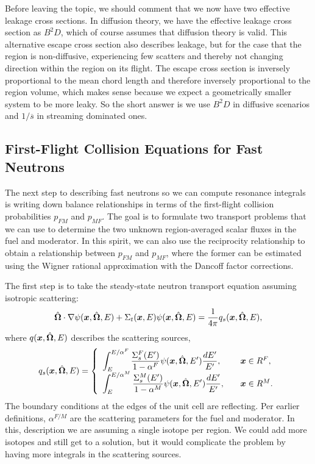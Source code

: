 Before leaving the topic, we should comment that we now have two effective leakage cross sections. In diffusion theory, we have the effective leakage cross section as $B^2 D$, which of course assumes that diffusion theory is valid. This alternative escape cross section also describes leakage, but for the case that the region is non-diffusive, experiencing few scatters and thereby not changing direction within the region on its flight. The escape cross section is inversely proportional to the mean chord length and therefore inversely proportional to the region volume, which makes sense because we expect a geometrically smaller system to be more leaky. So the short answer is we use $B^2 D$ in diffusive scenarios and $1/\overline{s}$ in streaming dominated ones.

\subsection{First-Flight Collision Equations for Fast Neutrons}

The next step to describing fast neutrons so we can compute resonance integrals is writing down balance relationships in terms of the first-flight collision probabilities $p_{FM}$ and $p_{MF}$. The goal is to formulate two transport problems that we can use to determine the two unknown region-averaged scalar fluxes in the fuel and moderator. In this spirit, we can also use the reciprocity relationship to obtain a relationship between $p_{FM}$ and $p_{MF}$, where the former can be estimated using the Wigner rational approximation with the Dancoff factor corrections.

The first step is to take the steady-state neutron transport equation assuming isotropic scattering:
\begin{align}
  \hat{\mathbf{\Omega}} \cdot \nabla \psi(\bm{x},\hat{\mathbf{\Omega}},E) + \Sigma_t(\bm{x},E) \psi(\bm{x},\hat{\mathbf{\Omega}},E) = \frac{1}{4\pi} q_s(\bm{x},\hat{\mathbf{\Omega}},E),
\end{align}
where $q(\bm{x},\hat{\mathbf{\Omega}},E)$ describes the scattering sources,
\begin{align}
  q_s(\bm{x},\hat{\mathbf{\Omega}},E) = \left\{ \begin{array}{l l}
  \displaystyle\int_E^{E/\alpha^F} \dfrac{ \Sigma_s^F(E') }{ 1 - \alpha^F } \psi(\bm{x},\hat{\mathbf{\Omega}},E') \dfrac{ dE' }{ E' } , & \quad \bm{x} \in R^F, \\
  \displaystyle\int_E^{E/\alpha^M} \dfrac{ \Sigma_s^M(E') }{ 1 - \alpha^M } \psi(\bm{x},\hat{\mathbf{\Omega}},E') \dfrac{ dE' }{ E' } , & \quad \bm{x} \in R^M. \\ \end{array} \right. 
\end{align}
The boundary conditions at the edges of the unit cell are reflecting. Per earlier definitions, $\alpha^{F/M}$ are the scattering parameters for the fuel and moderator. In this, description we are assuming a single isotope per region. We could add more isotopes and still get to a solution, but it would complicate the problem by having more integrals in the scattering sources. 

